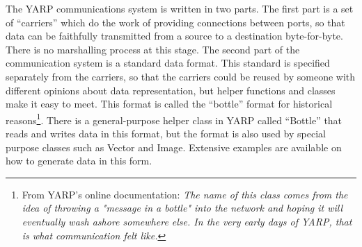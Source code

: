 The YARP communications system is written in two parts.  The 
first part is  a set of ``carriers'' which do the work of providing
connections between ports, so that data can be faithfully 
transmitted from a source to a destination byte-for-byte.
There is no marshalling process at this stage.
%
The second part of the communication system is a standard data format.
This standard is specified separately 
from the carriers, so that the carriers could be reused by
someone with different opinions about data representation, but helper
functions and classes make it easy to meet.  This format is called the
``bottle'' format for historical reasons\footnote{
From YARP's online documentation:
{\it The name of this class comes from the idea of throwing a "message in a
bottle" into the network and hoping it will eventually wash ashore
somewhere else. In the very early days of YARP, that is what
communication felt like.}
}.  
There is a general-purpose
helper class in YARP called ``Bottle'' that reads and writes data in
this format, but the format is also used by special purpose classes
such as Vector and Image.  Extensive examples are available on how
to generate data in this form.
%
%
%
